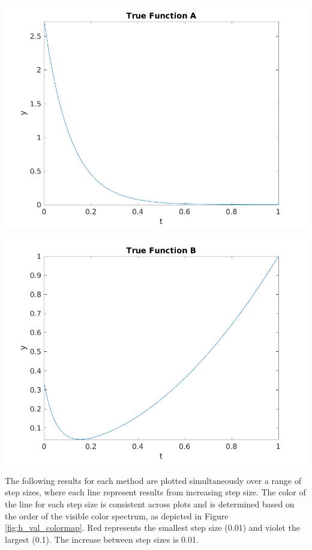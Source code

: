 \documentclass{article}
\begin{document}
\begin{center}
	\centering
    \begin{minipage}{0.5\textwidth}
        \centering
	    \includegraphics[width=1.1\textwidth]{../output/a_actual.png}
    \end{minipage}\hfill
    \begin{minipage}{0.5\textwidth}
        \centering
	    \includegraphics[width=1.1\textwidth]{../output/b_actual.png}
    \end{minipage}
 	\label{fig:true}
\end{center}

The following results for each method are plotted simultaneously over a range of step sizes, where each line represent results from increasing step size. The color of the line for each step size is consistent across plots and is determined based on the order of the visible color spectrum, as depicted in Figure \ref{fig:h_val_colormap}. Red represents the smallest step size (0.01) and violet the largest (0.1). The increase between step sizes is 0.01. 
\end{document}
